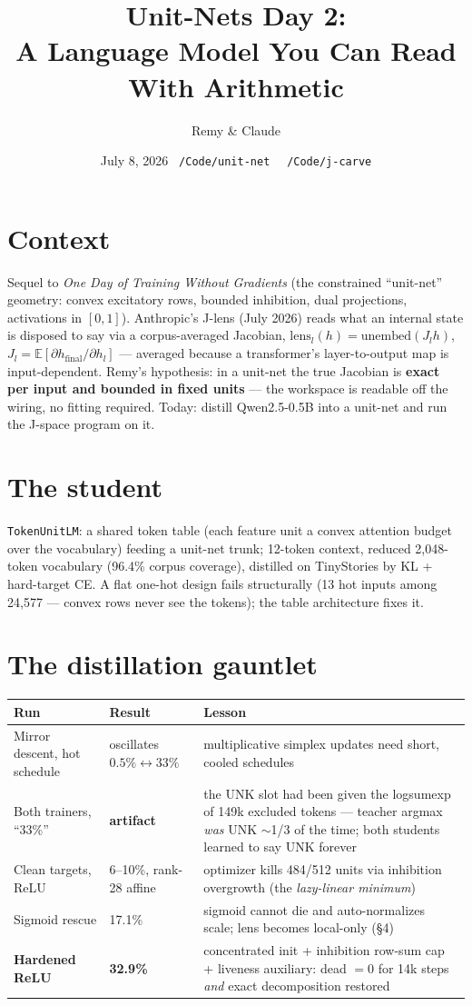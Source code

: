 \documentclass[10pt]{article}
\title{\textbf{Unit-Nets Day 2:\\A Language Model You Can Read With
Arithmetic}}
\author{Remy \& Claude}
\date{July 8, 2026 \quad \texttt{\small~/Code/unit-net}
 \ \texttt{\small~/Code/j-carve}}
\begin{document}
\maketitle

\section{Context}
Sequel to \emph{One Day of Training Without Gradients} (the constrained
``unit-net'' geometry: convex excitatory rows, bounded inhibition, dual
projections, activations in $[0,1]$). Anthropic's J-lens (July 2026) reads
what an internal state is disposed to say via a corpus-averaged Jacobian,
$\mathrm{lens}_l(h) = \mathrm{unembed}(J_l h)$,
$J_l = \mathbb{E}[\partial h_{\mathrm{final}}/\partial h_l]$ --- averaged
because a transformer's layer-to-output map is input-dependent. Remy's
hypothesis: in a unit-net the true Jacobian is \textbf{exact per input and
bounded in fixed units} --- the workspace is readable off the wiring, no
fitting required. Today: distill Qwen2.5-0.5B into a unit-net and run the
J-space program on it.

\section{The student}
\texttt{TokenUnitLM}: a shared token table (each feature unit a convex
attention budget over the vocabulary) feeding a unit-net trunk; 12-token
context, reduced 2{,}048-token vocabulary (96.4\% corpus coverage),
distilled on TinyStories by KL + hard-target CE. A flat one-hot design
fails structurally (13 hot inputs among 24{,}577 --- convex rows never see
the tokens); the table architecture fixes it.

\section{The distillation gauntlet}
\begin{center}\small\begin{tabular}{@{}p{4.2cm}p{2.6cm}p{7.4cm}@{}}\toprule
Run & Result & Lesson\\\midrule
Mirror descent, hot schedule & oscillates $0.5\%\!\leftrightarrow\!33\%$ &
multiplicative simplex updates need short, cooled schedules\\
Both trainers, ``33\%'' & \textbf{artifact} & the UNK slot had been given
the logsumexp of 149k excluded tokens --- teacher argmax \emph{was} UNK
$\sim$1/3 of the time; both students learned to say UNK forever\\
Clean targets, ReLU & 6--10\%, rank-28 affine & optimizer kills 484/512
units via inhibition overgrowth (the \emph{lazy-linear minimum})\\
Sigmoid rescue & 17.1\% & sigmoid cannot die and auto-normalizes scale;
lens becomes local-only (\S4)\\
\textbf{Hardened ReLU} & \textbf{32.9\%} & concentrated init + inhibition
row-sum cap + liveness auxiliary: dead $=0$ for 14k steps \emph{and}
exact decomposition restored\\
\bottomrule\end{tabular}\end{center}
\end{document}
